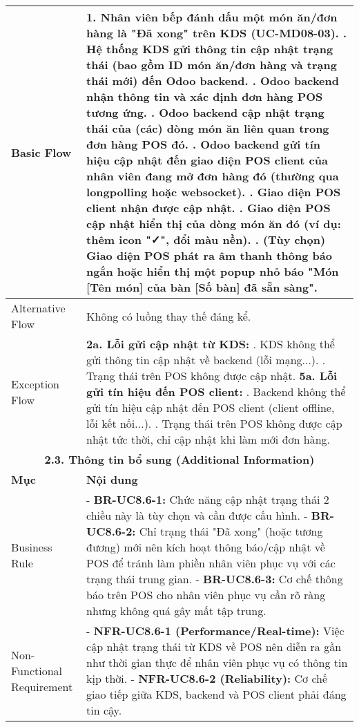 \begin{longtable}{|m{4cm}|p{11cm}|}
Basic Flow & 1. Nhân viên bếp đánh dấu một món ăn/đơn hàng là "Đã xong" trên KDS (UC-MD08-03). \newline 2. Hệ thống KDS gửi thông tin cập nhật trạng thái (bao gồm ID món ăn/đơn hàng và trạng thái mới) đến Odoo backend. \newline 3. Odoo backend nhận thông tin và xác định đơn hàng POS tương ứng. \newline 4. Odoo backend cập nhật trạng thái của (các) dòng món ăn liên quan trong đơn hàng POS đó. \newline 5. Odoo backend gửi tín hiệu cập nhật đến giao diện POS client của nhân viên đang mở đơn hàng đó (thường qua longpolling hoặc websocket). \newline 6. Giao diện POS client nhận được cập nhật. \newline 7. Giao diện POS cập nhật hiển thị của dòng món ăn đó (ví dụ: thêm icon "✓", đổi màu nền). \newline 8. (Tùy chọn) Giao diện POS phát ra âm thanh thông báo ngắn hoặc hiển thị một popup nhỏ báo "Món [Tên món] của bàn [Số bàn] đã sẵn sàng". \\
\hline
Alternative Flow & Không có luồng thay thế đáng kể. \\
\hline
Exception Flow & \textbf{2a. Lỗi gửi cập nhật từ KDS:} \newline    1. KDS không thể gửi thông tin cập nhật về backend (lỗi mạng...). \newline    2. Trạng thái trên POS không được cập nhật. \newline \textbf{5a. Lỗi gửi tín hiệu đến POS client:} \newline    1. Backend không thể gửi tín hiệu cập nhật đến POS client (client offline, lỗi kết nối...). \newline    2. Trạng thái trên POS không được cập nhật tức thời, chỉ cập nhật khi làm mới đơn hàng. \\
\hline
\multicolumn{2}{|c|}{\textbf{2.3. Thông tin bổ sung (Additional Information)}} \\
\hline
\textbf{Mục} & \textbf{Nội dung} \\
\hline
Business Rule & - \textbf{BR-UC8.6-1:} Chức năng cập nhật trạng thái 2 chiều này là tùy chọn và cần được cấu hình. \newline - \textbf{BR-UC8.6-2:} Chỉ trạng thái "Đã xong" (hoặc tương đương) mới nên kích hoạt thông báo/cập nhật về POS để tránh làm phiền nhân viên phục vụ với các trạng thái trung gian. \newline - \textbf{BR-UC8.6-3:} Cơ chế thông báo trên POS cho nhân viên phục vụ cần rõ ràng nhưng không quá gây mất tập trung. \\
\hline
Non-Functional Requirement & - \textbf{NFR-UC8.6-1 (Performance/Real-time):} Việc cập nhật trạng thái từ KDS về POS nên diễn ra gần như thời gian thực để nhân viên phục vụ có thông tin kịp thời. \newline - \textbf{NFR-UC8.6-2 (Reliability):} Cơ chế giao tiếp giữa KDS, backend và POS client phải đáng tin cậy. \\
\hline
\end{longtable}

